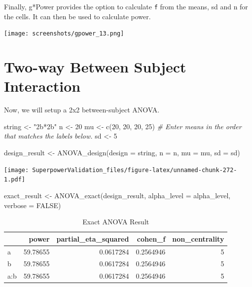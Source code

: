 \documentclass[
]{book}
\newenvironment{Shaded}{\begin{snugshade}}{\end{snugshade}}
\newcommand{\AttributeTok}[1]{\textcolor[rgb]{0.77,0.63,0.00}{#1}}
\newcommand{\CommentTok}[1]{\textcolor[rgb]{0.56,0.35,0.01}{\textit{#1}}}
\newcommand{\ConstantTok}[1]{\textcolor[rgb]{0.00,0.00,0.00}{#1}}
\newcommand{\DecValTok}[1]{\textcolor[rgb]{0.00,0.00,0.81}{#1}}
\newcommand{\FunctionTok}[1]{\textcolor[rgb]{0.00,0.00,0.00}{#1}}
\newcommand{\NormalTok}[1]{#1}
\newcommand{\OtherTok}[1]{\textcolor[rgb]{0.56,0.35,0.01}{#1}}
\newcommand{\StringTok}[1]{\textcolor[rgb]{0.31,0.60,0.02}{#1}}
\begin{document}
Finally, g*Power \citep{faul2007g} provides the option to calculate \texttt{f} from the means, sd and n for the cells. It can then be used to calculate power.

\texttt{[image: screenshots/gpower\_13.png]}

\hypertarget{two-way-between-subject-interaction}{%
\section{Two-way Between Subject Interaction}\label{two-way-between-subject-interaction}}

Now, we will setup a 2x2 between-subject ANOVA.

\begin{Shaded}
\begin{Highlighting}[]
\NormalTok{string }\OtherTok{\textless{}{-}} \StringTok{"2b*2b"}
\NormalTok{n }\OtherTok{\textless{}{-}} \DecValTok{20}
\NormalTok{mu }\OtherTok{\textless{}{-}} \FunctionTok{c}\NormalTok{(}\DecValTok{20}\NormalTok{, }\DecValTok{20}\NormalTok{, }\DecValTok{20}\NormalTok{, }\DecValTok{25}\NormalTok{) }
\CommentTok{\# Enter means in the order that matches the labels below.}
\NormalTok{sd }\OtherTok{\textless{}{-}} \DecValTok{5}

\NormalTok{design\_result }\OtherTok{\textless{}{-}} \FunctionTok{ANOVA\_design}\NormalTok{(}\AttributeTok{design =}\NormalTok{ string,}
                   \AttributeTok{n =}\NormalTok{ n, }
                   \AttributeTok{mu =}\NormalTok{ mu, }
                   \AttributeTok{sd =}\NormalTok{ sd)}
\end{Highlighting}
\end{Shaded}

\texttt{[image: SuperpowerValidation\_files/figure-latex/unnamed-chunk-272-1.pdf]}

\begin{Shaded}
\begin{Highlighting}[]
\NormalTok{exact\_result }\OtherTok{\textless{}{-}} \FunctionTok{ANOVA\_exact}\NormalTok{(design\_result,}
                            \AttributeTok{alpha\_level =}\NormalTok{ alpha\_level,}
                            \AttributeTok{verbose =} \ConstantTok{FALSE}\NormalTok{)}
\end{Highlighting}
\end{Shaded}

\begin{table}[!h]

\caption{\label{tab:unnamed-chunk-273}Exact ANOVA Result}
\centering
\begin{tabular}[t]{l|r|r|r|r}
\hline
  & power & partial\_eta\_squared & cohen\_f & non\_centrality\\
\hline
a & 59.78655 & 0.0617284 & 0.2564946 & 5\\
\hline
b & 59.78655 & 0.0617284 & 0.2564946 & 5\\
\hline
a:b & 59.78655 & 0.0617284 & 0.2564946 & 5\\
\hline
\end{tabular}
\end{table}
\end{document}
